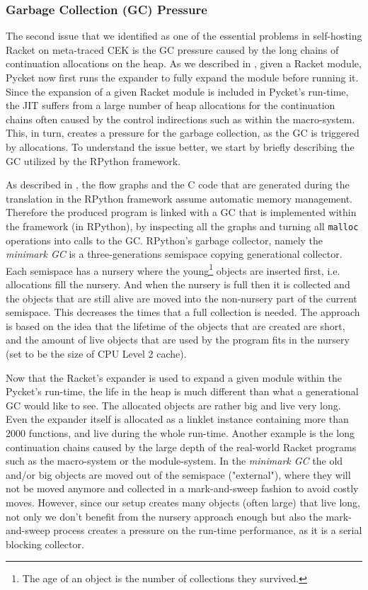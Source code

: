 \subsubsection{Garbage Collection (GC) Pressure}

The second issue that we identified as one of the essential problems
in self-hosting Racket on meta-traced CEK is the GC pressure caused by
the long chains of continuation allocations on the heap. As we
described in , given a Racket module, Pycket now
first runs the expander to fully expand the module before running
it. Since the expansion of a given Racket module is included in
Pycket's run-time, the JIT suffers from a large number of heap
allocations for the continuation chains often caused by the control
indirections such as within the macro-system. This, in turn, creates a
pressure for the garbage collection, as the GC is triggered by
allocations. To understand the issue better, we start by briefly
describing the GC utilized by the RPython framework.

As described in , the flow graphs and the C
code that are generated during the translation in the RPython
framework assume automatic memory management. Therefore the produced
program is linked with a GC that is implemented within the framework
(in RPython), by inspecting all the graphs and turning all
\texttt{malloc} operations into calls to the GC. RPython's garbage
collector, namely the \emph{minimark GC} is a three-generations
semispace copying generational collector. Each semispace has a nursery
where the young\footnote{The age of an object is the number of
  collections they survived.}  objects are inserted first,
i.e. allocations fill the nursery. And when the nursery is full then
it is collected and the objects that are still alive are moved into
the non-nursery part of the current semispace. This decreases the
times that a full collection is needed. The approach is based on the
idea that the lifetime of the objects that are created are short, and
the amount of live objects that are used by the program fits in the
nursery (set to be the size of CPU Level 2 cache). \cite{pypy06,
  bolz:14, gc:16, gc:12}

Now that the Racket's expander is used to expand a given module within
the Pycket's run-time, the life in the heap is much different than
what a generational GC would like to see. The allocated objects are
rather big and live very long. Even the expander itself is allocated
as a linklet instance containing more than 2000 functions, and live
during the whole run-time. Another example is the long continuation
chains caused by the large depth of the real-world Racket programs
such as the macro-system or the module-system. In the \emph{minimark
  GC} the old and/or big objects are moved out of the semispace
("external"), where they will not be moved anymore and collected in a
mark-and-sweep fashion to avoid costly moves. However, since our setup
creates many objects (often large) that live long, not only we don't
benefit from the nursery approach enough but also the mark-and-sweep
process creates a pressure on the run-time performance, as it is a
serial blocking collector.

